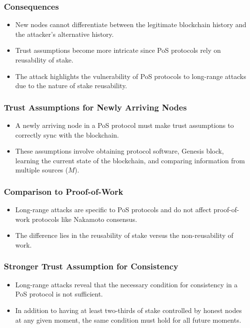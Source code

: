 \subsubsection{Consequences}
\begin{itemize}
    \item New nodes cannot differentiate between the legitimate blockchain history and the attacker's alternative history.
    \item Trust assumptions become more intricate since PoS protocols rely on reusability of stake.
    \item The attack highlights the vulnerability of PoS protocols to long-range attacks due to the nature of stake reusability.
\end{itemize}

\subsubsection{Trust Assumptions for Newly Arriving Nodes}
\begin{itemize}
    \item A newly arriving node in a PoS protocol must make trust assumptions to correctly sync with the blockchain.
    \item These assumptions involve obtaining protocol software, Genesis block, learning the current state of the blockchain, and comparing information from multiple sources ($M$).
\end{itemize}

\subsubsection{Comparison to Proof-of-Work}
\begin{itemize}
    \item Long-range attacks are specific to PoS protocols and do not affect proof-of-work protocols like Nakamoto consensus.
    \item The difference lies in the reusability of stake versus the non-reusability of work.
\end{itemize}

\subsubsection{Stronger Trust Assumption for Consistency}
\begin{itemize}
    \item Long-range attacks reveal that the necessary condition for consistency in a PoS protocol is not sufficient.
    \item In addition to having at least two-thirds of stake controlled by honest nodes at any given moment, the same condition must hold for all future moments.
\end{itemize}


